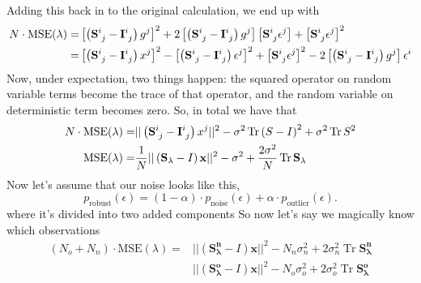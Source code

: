 \documentclass[11pt]{article}
\DeclareMathOperator{\Tr}{Tr}
\begin{document}
Adding this back in to the original calculation, we end up with
\begin{align}
    N \cdot \textrm{MSE}(\lambda)  =& \left[ \left(\mathbf{S}\indices{^i_j} -\mathbf{I}\indices{^i_j} \right) g^j \right]^2 + 2 \left[ \left(\mathbf{S}\indices{^i_j} -\mathbf{I}\indices{^i_j} \right) g^j \right]  \left[ \mathbf{S}\indices{^i_j} \epsilon^j \right]+ \left[ \mathbf{S}\indices{^i_j} \epsilon^j \right]^2 \\
    =&  \left[ \left(\mathbf{S}\indices{^i_j} -\mathbf{I}\indices{^i_j} \right)x^j \right]^2 - \left[ \left(\mathbf{S}\indices{^i_j} -\mathbf{I}\indices{^i_j} \right)\epsilon^j \right]^2 + \left[ \mathbf{S}\indices{^i_j} \epsilon^j \right]^2 - 2 \left[ \left(\mathbf{S}\indices{^i_j} -\mathbf{I}\indices{^i_j} \right) g^j \right] \epsilon^i
\end{align}
Now, under expectation, two things happen: the squared operator on random variable terms become the trace of that operator, and the random variable on deterministic term becomes zero. So, in total we have that
\begin{align}
    N \cdot \textrm{MSE}(\lambda)  =& || \left(\mathbf{S}\indices{^i_j} -\mathbf{I}\indices{^i_j} \right)x^j ||^2 - \sigma^2 \Tr \left(S - I\right)^2 + \sigma^2 \Tr S^2 \\
    \textrm{MSE}(\lambda) =& \frac{1}{N} || \left( \mathbf{S_\lambda} - I \right) \mathbf{x} ||^2 - \sigma^2 + \frac{2 \sigma^2}{N}  \Tr \mathbf{S_\lambda}
\end{align}
Now let's assume that our noise looks like this,
\begin{equation}
\label{robust_pdf}
    p_{\textrm{robust}}(\epsilon) = (1-\alpha) \cdot p_{\textrm{noise}}(\epsilon) + \alpha \cdot  p_{\textrm{outlier}}(\epsilon).
\end{equation}
where it's divided into two added components So now let's say we magically know which observations
\begin{align}
    (N_o + N_n) \cdot  \textrm{MSE}(\lambda) =& || \left( \mathbf{S^n_\lambda} - I \right) \mathbf{x} ||^2 - N_n \sigma_n^2  + 2  \sigma_n^2  \Tr \mathbf{S^n_\lambda} \\
    & || \left( \mathbf{S^o_\lambda} - I \right) \mathbf{x} ||^2 -  N_o \sigma_o^2 + 2 \sigma_o^2  \Tr \mathbf{S^o_\lambda}
\end{align}
\end{document}
